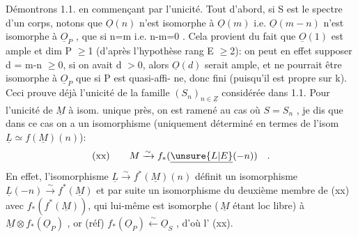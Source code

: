 Démontrons  1.1.  en commençant par l'unicité.  Tout d'abord, si S est
le spectre d'un corps, notons que  $\underline{O}(n)$ n'est isomorphe à $\underline{O}(m)$ i.e.
$\underline{O}(m-n)$  n'est  isomorphe à $\underline{O}_P$ , que si  n=m i.e.  n-m=0 .  Cela provient
du fait que $\underline{O}(1)$ est ample et  dim P $\geqslant$1 (d'après l'hypothèse rang E $\geqslant$2):
on peut en effet supposer  d = m-n $\geqslant$0, si on avait d $>$0, alors $\underline{O}(d)$
serait ample, et ne pourrait être isomorphe à  $\underline{O}_P$ que si P est quasi-affi-%
ne, donc fini (puisqu'il est propre sur k).  Ceci prouve déjà  l'unicité
de la famille $(S_n)_{n\in\underline{Z}}$  considérée dans 1.1.  Pour l'unicité de $\underline{M}$ à isom.
unique près, on est ramené au cas où  $S=S_n$ , je dis que dans ce cas on a
un isomorphisme  (uniquement déterminé en termes de l'isom  $\underline{L} \simeq f$$(\underline{M})(n)$):
\[ \text{(xx)} \qquad M \xrightarrow{\sim} f_*(\underline{\unsure{L|E}}(-n)) \quad . \]
En effet,  l'isomorphisme  $\underline{L} \xrightarrow{\sim} f^*(\underline{M})(n)$   définit un isomorphisme
$\underline{L}(-n) \xrightarrow{\sim} f^*(\underline{M})$  et par suite un isomorphisme du deuxième membre de (xx)
avec $f_*(f^*(\underline{M}))$, qui lui-même est isomorphe (\,$\underline{M}$ étant loc libre) à
$\underline{M}\otimes f_*(\underline{O}_P)$ , or  (réf)  $f_*(\underline{O}_P) \xleftarrow{\sim} \underline{O}_S$ ,  d'où l' (xx).

